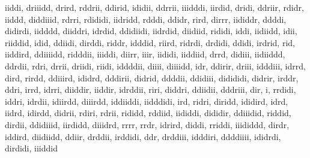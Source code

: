 \documentclass{article}
\begin{document}
iiddi, driiidd, drird, rddrii, ddirid, ididii, ddrrii, iiidddi, iirdid, dridi, ddriir, rdidr, iiddd, diddiiid, rdrri, rdididi, iidridd, rdddi, ddidr, rird, dirrr, iididdr, ddddi, didirdi, iidddd, diiddri, idrdid, ddidiidi, iidrdid, diidiid, rididi, iddi, iidiidd, idii, riiddid, idid, ddiidi, dirddi, riddr, idddid, riird, ridrdi, drdidi, ddidi, irdrid, rid, iiddird, ddiiiidd, ridddii, iiiddi, diirr, iiir, iididi, iiddiid, drrd, didiii, iidiiddd, ddrdii, rdri, drrii, driidi, riidi, iddddii, diiii, diiiidd, idr, ddirir, driii, idddiii, idrrd, dird, rirdd, ddiiird, ididrd, dddirii, didrid, ddddii, ddidiii, didididi, didrir, irddr, ddri, irrd, idrri, diiddir, iiddir, idrddii, riri, diddri, ddiidii, dddriii, dir, i, rrdidi, iddri, idrdii, idiirdd, diiirdd, iddiiddi, iidddidi, ird, ridri, diridd, ididird, idrd, iidrd, idirdd, didrii, rdiri, rdrii, rididd, rddiid, iididdi, dididir, ddiiidid, riddid, dirdii, ddidiiid, iirdidd, diiidrd, rrrr, rrdr, idrird, diddi, rriddi, iiididdd, dirdr, iddird, diidiidd, ddiir, drddii, irddidi, ddr, drddiii, idddiri, ddddiiii, ididrdi, dirdidi, iiiddid



\end{document}

